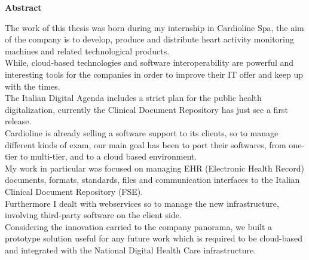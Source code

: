 \thispagestyle{empty}
\vspace*{\fill}
  \begin{center}
    {\bf \Huge Abstract}
  \end{center}

  \vspace{4cm}
  
  The work of this thesis was born during my internship in Cardioline Spa, the aim of the company is to develop, produce and distribute heart activity monitoring machines and related technological products.\\While, cloud-based technologies and software interoperability are powerful and interesting tools for the companies in order to improve their IT offer and keep up with the times.\\The Italian Digital Agenda includes a strict plan for the public health digitalization, currently the Clinical Document Repository has just see a first release.\\Cardioline is already selling a software support to its clients, so to manage different kinds of exam, our main goal has been to port their softwares, from one-tier to multi-tier, and to a cloud based environment.\\My work in particular was focused on managing EHR (Electronic Health Record) documents, formats, standards, files and communication interfaces to the Italian Clinical Document Repository (FSE).\\Furthermore I dealt with webservices so to manage the new infrastructure, involving third-party software on the client side.\\Considering the innovation carried to the company panorama, we built a prototype solution useful for any future work which is required to be cloud-based and integrated with the National Digital Health Care infrastructure.

\vspace*{\fill}